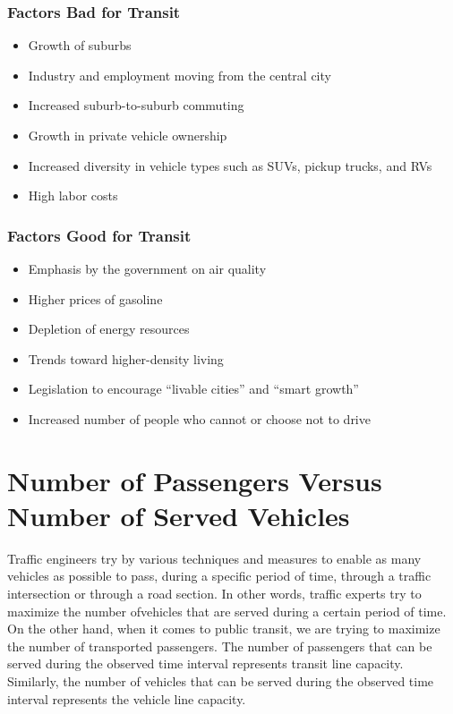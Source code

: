 \subsubsection{Factors Bad for Transit}
\begin{itemize}
	\item Growth of suburbs
	\item Industry and employment moving from the central city
	\item Increased suburb-to-suburb commuting
	\item Growth in private vehicle ownership
	\item Increased diversity in vehicle types such as SUVs, pickup trucks, and RVs
	\item High labor costs
\end{itemize}
%
\subsubsection{Factors Good for Transit}
\begin{itemize}
	\item Emphasis by the government on air quality
	\item Higher prices of gasoline
	\item Depletion of energy resources
	\item Trends toward higher-density living
	\item Legislation to encourage “livable cities” and “smart growth”
	\item Increased number of people who cannot or choose not to drive 
\end{itemize}
%
\section{Number of Passengers Versus Number of Served Vehicles}
Traffic engineers try by various techniques and measures to enable as many vehicles as possible to pass,
during a specific period of time, through a traffic intersection or through a road section. In other words, traffic experts try to maximize the number ofvehicles that are served during a certain period of time. On the other hand, when it comes to public transit, we are trying to maximize the number of transported passengers. The number of passengers that can be served during the observed time interval represents transit line capacity. Similarly, the number of vehicles that can be served during the observed time interval represents the vehicle line capacity.
